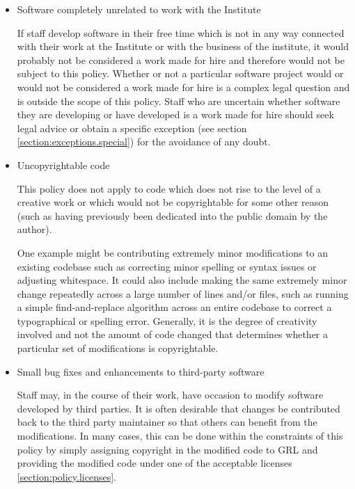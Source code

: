 \documentclass[10pt,a4paper]{article}
\begin{document}
\begin{itemize}

\item Software completely unrelated to work with the Institute

\par If staff develop software in their free time which is not in any way connected 
with their work at the Institute or with the business of the institute, it would 
probably not be considered a work made for hire and therefore would not be 
subject to this policy. Whether or not a particular software project would or 
would not be considered a work made for hire is a complex legal question and 
is outside the scope of this policy. Staff who are uncertain whether software 
they are developing or have developed is a work made for hire should seek 
legal advice or obtain a specific exception (see section \ref{section:exceptions.special}) 
for the avoidance of any doubt. 

\item Uncopyrightable code

\par This policy does not apply to code which does not rise to the level of a 
creative work or which would not be copyrightable for some other reason 
(such as having previously been dedicated into the public domain by the author). 

\par One example might be contributing extremely minor modifications to an existing 
codebase such as correcting minor spelling or syntax issues or adjusting whitespace. 
It could also include making the same extremely minor change repeatedly across a 
large number of lines and/or files, such as running a simple find-and-replace 
algorithm across an entire codebase to correct a typographical or spelling error. 
Generally, it is the degree of creativity involved and not the amount of code changed 
that determines whether a particular set of modifications is copyrightable. 


\item Small bug fixes and enhancements to third-party software

\par Staff may, in the course of their work, have occasion to modify software 
developed by third parties. It is often desirable that changes be contributed 
back to the third party maintainer so that others can benefit from the modifications. 
In many cases, this can be done within the constraints of this policy by simply 
assigning copyright in the modified code to GRL and providing the modified code 
under one of the acceptable licenses \ref{section:policy.licenses}. 


\end{itemize}
\end{document}
